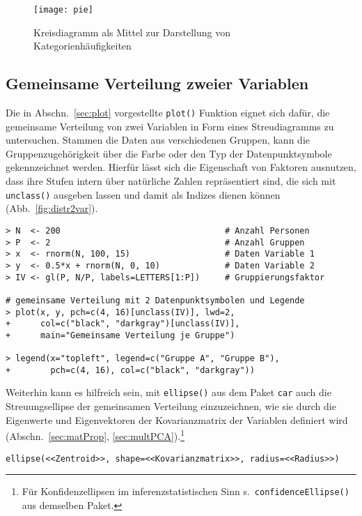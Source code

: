 \begin{figure}[ht]
\centering
\texttt{[image: pie]}
\vspace*{-1.5em}
\caption{Kreisdiagramm als Mittel zur Darstellung von Kategorienhäufigkeiten}
\label{fig:pie}
\end{figure}

\subsection{Gemeinsame Verteilung zweier Variablen}
\label{sec:distr2var}

Die in Abschn.\ \ref{sec:plot} vorgestellte \lstinline!plot()! Funktion eignet sich dafür, die gemeinsame Verteilung von zwei Variablen in Form eines Streudiagramms zu untersuchen. Stammen die Daten aus verschiedenen Gruppen, kann die Gruppenzugehörigkeit über die Farbe oder den Typ der Datenpunktsymbole gekennzeichnet werden. Hierfür lässt sich die Eigenschaft von Faktoren ausnutzen, dass ihre Stufen intern über natürliche Zahlen repräsentiert sind, die sich mit \lstinline!unclass()! ausgeben lassen und damit als Indizes dienen können (Abb.\ \ref{fig:distr2var}).
\begin{lstlisting}
> N  <- 200                                 # Anzahl Personen
> P  <- 2                                   # Anzahl Gruppen
> x  <- rnorm(N, 100, 15)                   # Daten Variable 1
> y  <- 0.5*x + rnorm(N, 0, 10)             # Daten Variable 2
> IV <- gl(P, N/P, labels=LETTERS[1:P])     # Gruppierungsfaktor

# gemeinsame Verteilung mit 2 Datenpunktsymbolen und Legende
> plot(x, y, pch=c(4, 16)[unclass(IV)], lwd=2,
+      col=c("black", "darkgray")[unclass(IV)],
+      main="Gemeinsame Verteilung je Gruppe")

> legend(x="topleft", legend=c("Gruppe A", "Gruppe B"),
+        pch=c(4, 16), col=c("black", "darkgray"))
\end{lstlisting}

Weiterhin kann es hilfreich sein, mit \lstinline!ellipse()!  aus dem Paket \lstinline!car! auch die Streuungsellipse der gemeinsamen Verteilung einzuzeichnen, wie sie durch die Eigenwerte und Eigenvektoren der Kovarianzmatrix der Variablen definiert wird (Abschn.\ \ref{sec:matProp}, \ref{sec:multPCA}).\footnote{Für Konfidenzellipsen im inferenzstatistischen Sinn s.\ \lstinline!confidenceEllipse()!  aus demselben Paket.}
\begin{lstlisting}
ellipse(<<Zentroid>>, shape=<<Kovarianzmatrix>>, radius=<<Radius>>)
\end{lstlisting}

